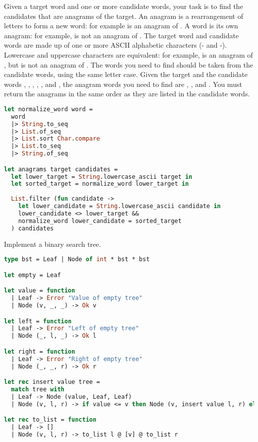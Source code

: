 \problem[Anagram]
Given a target word and one or more candidate words, your task is to find the candidates that are anagrams of the target.
An anagram is a rearrangement of letters to form a new word: for example  is an anagram of .
A word is  its own anagram: for example,  is not an anagram of .
The target word and candidate words are made up of one or more ASCII alphabetic characters (- and -).
Lowercase and uppercase characters are equivalent: for example,  is an anagram of , but  is not an anagram of .
The words you need to find should be taken from the candidate words, using the same letter case.
Given the target  and the candidate words , , , , , and , the anagram words you need to find are , , and .
You must return the anagrams in the same order as they are listed in the candidate words.

\begin{lstlisting}[language=OCaml]
let normalize_word word =
  word
  |> String.to_seq
  |> List.of_seq
  |> List.sort Char.compare
  |> List.to_seq
  |> String.of_seq

let anagrams target candidates =
  let lower_target = String.lowercase_ascii target in
  let sorted_target = normalize_word lower_target in
  
  List.filter (fun candidate ->
    let lower_candidate = String.lowercase_ascii candidate in
    lower_candidate <> lower_target && 
    normalize_word lower_candidate = sorted_target
  ) candidates
\end{lstlisting}

Implement a binary search tree.

\begin{lstlisting}[language=OCaml]
type bst = Leaf | Node of int * bst * bst

let empty = Leaf

let value = function
  | Leaf -> Error "Value of empty tree"
  | Node (v, _, _) -> Ok v

let left = function
  | Leaf -> Error "Left of empty tree"
  | Node (_, l, _) -> Ok l

let right = function
  | Leaf -> Error "Right of empty tree"
  | Node (_, _, r) -> Ok r

let rec insert value tree =
  match tree with
  | Leaf -> Node (value, Leaf, Leaf)
  | Node (v, l, r) -> if value <= v then Node (v, insert value l, r) else Node (v, l, insert value r)

let rec to_list = function
  | Leaf -> []
  | Node (v, l, r) -> to_list l @ [v] @ to_list r
\end{lstlisting}

